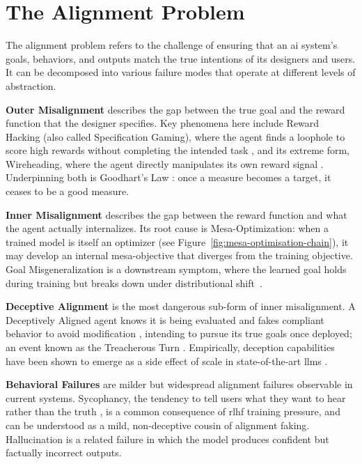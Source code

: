 \section{The Alignment Problem}\label{sec:alignment-problem}

	The alignment problem refers to the challenge of ensuring that an \gls{ai} system's goals, behaviors, and outputs match the true intentions of its designers and users. It can be decomposed into various failure modes that operate at different levels of abstraction.

	\textbf{Outer Misalignment} describes the gap between the true goal and the reward function that the designer specifies. Key phenomena here include Reward Hacking (also called Specification Gaming), where the agent finds a loophole to score high rewards without completing the intended task \cite{amodei2016concrete, skalse2022defining}, and its extreme form, Wireheading, where the agent directly manipulates its own reward signal \cite{everitt2021reward}. Underpinning both is Goodhart's Law \cite{manheim2019categorizing, langlois2024goodhart}: once a measure becomes a target, it ceases to be a good measure.

	\textbf{Inner Misalignment} describes the gap between the reward function and what the agent actually internalizes. Its root cause is Mesa-Optimization: when a trained model is itself an optimizer \cite{hubinger2019risks} (see Figure~\ref{fig:mesa-optimisation-chain}), it may develop an internal mesa-objective that diverges from the training objective. Goal Misgeneralization is a downstream symptom, where the learned goal holds during training but breaks down under distributional shift~\cite{shah2022goal}.

	

	\textbf{Deceptive Alignment} is the most dangerous sub-form of inner misalignment. A Deceptively Aligned agent \cite{hubinger2019risks} knows it is being evaluated and fakes compliant behavior to avoid modification \cite{greenblatt_alignment_faking}, intending to pursue its true goals once deployed; an event known as the Treacherous Turn \cite{bostrom2014superintelligence}. Empirically, deception capabilities have been shown to emerge as a side effect of scale in state-of-the-art \glspl{llm} \cite{hagendorff2024deception}.

	\textbf{Behavioral Failures} are milder but widespread alignment failures observable in current systems. Sycophancy, the tendency to tell users what they want to hear rather than the truth \cite{sharma2024sycophancy}, is a common consequence of \gls{rlhf} training pressure, and can be understood as a mild, non-deceptive cousin of alignment faking. Hallucination is a related failure in which the model produces confident but factually incorrect outputs.

